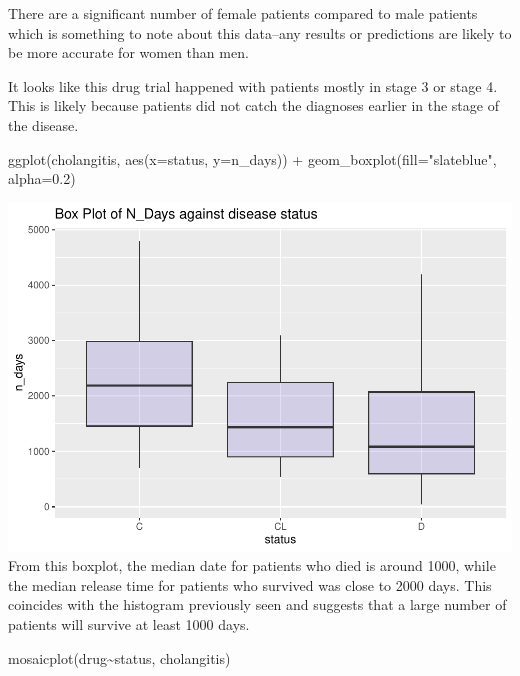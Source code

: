 \documentclass[
]{article}
\newenvironment{Shaded}{\begin{snugshade}}{\end{snugshade}}
\newcommand{\AttributeTok}[1]{\textcolor[rgb]{0.77,0.63,0.00}{#1}}
\newcommand{\FloatTok}[1]{\textcolor[rgb]{0.00,0.00,0.81}{#1}}
\newcommand{\FunctionTok}[1]{\textcolor[rgb]{0.00,0.00,0.00}{#1}}
\newcommand{\NormalTok}[1]{#1}
\newcommand{\SpecialCharTok}[1]{\textcolor[rgb]{0.00,0.00,0.00}{#1}}
\newcommand{\StringTok}[1]{\textcolor[rgb]{0.31,0.60,0.02}{#1}}
\begin{document}
There are a significant number of female patients compared to male
patients which is something to note about this data--any results or
predictions are likely to be more accurate for women than men.

It looks like this drug trial happened with patients mostly in stage 3
or stage 4. This is likely because patients did not catch the diagnoses
earlier in the stage of the disease.

\begin{Shaded}
\begin{Highlighting}[]
\FunctionTok{ggplot}\NormalTok{(cholangitis, }\FunctionTok{aes}\NormalTok{(}\AttributeTok{x=}\NormalTok{status, }\AttributeTok{y=}\NormalTok{n\_days)) }\SpecialCharTok{+} 
    \FunctionTok{geom\_boxplot}\NormalTok{(}\AttributeTok{fill=}\StringTok{"slateblue"}\NormalTok{, }\AttributeTok{alpha=}\FloatTok{0.2}\NormalTok{)}
\end{Highlighting}
\end{Shaded}

\includegraphics{final_proj_files/figure-latex/n_days and status-1.pdf}
From this boxplot, the median date for patients who died is around 1000,
while the median release time for patients who survived was close to
2000 days. This coincides with the histogram previously seen and
suggests that a large number of patients will survive at least 1000
days.

\begin{Shaded}
\begin{Highlighting}[]
\FunctionTok{mosaicplot}\NormalTok{(drug}\SpecialCharTok{\textasciitilde{}}\NormalTok{status, cholangitis)}
\end{Highlighting}
\end{Shaded}
\end{document}
